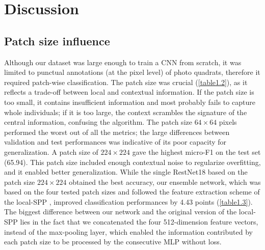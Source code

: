 \newpage

\section{Discussion}\label{chapitre1_7}

\subsection{Patch size influence}\label{chapitre1_7.1}
Although our dataset was large enough to train a CNN from scratch, it was limited to punctual annotations (at the pixel level) of photo quadrats, therefore it required patch-wise classification. The patch size was crucial (\autoref{table1.2}), as it reflects a trade-off between local and contextual information. If the patch size is too small, it contains insufficient information and most probably fails to capture whole individuals; if it is too large, the context scrambles the signature of the central information, confusing the algorithm. The patch size \(64 \times 64\) pixels performed the worst out of all the metrics; the large differences between validation and test performances was indicative of its poor capacity for generalization. A patch size of \(224 \times 224\) gave the highest micro-F1 on the test set (65.94). This patch size included enough contextual noise to regularize overfitting, and it enabled better generalization. While the single RestNet18 based on the patch size \(224 \times 224\) obtained the best accuracy, our ensemble network, which was based on the four tested patch sizes and followed the feature extraction scheme of the local-SPP \citep{mahmood_coral_2016}, improved classification performances by 4.43 points (\autoref{table1.3}). The biggest difference between our network and the original version of the local-SPP lies in the fact that we concatenated the four 512-dimension feature vectors, instead of the max-pooling layer, which enabled the information contributed by each patch size to be processed by the consecutive MLP without loss.

